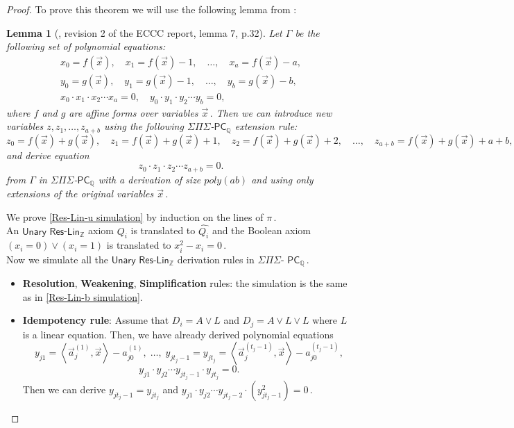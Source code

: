 \documentclass[11pt]{article}
\newtheorem{lemma}[theorem]{Lemma}
\newcommand{\Q}{{\mathbb Q}}
\newcommand{\Z}{{\mathbb Z}}
\begin{document}
\begin{proof}
To prove this theorem we will use the following lemma from \cite{IMP19_new}:
\begin{lemma}[\cite{IMP19_new}, revision 2 of the ECCC report, lemma 7, p.32]\label{lem:unary sum}
%
%
Let $\Gamma$ be the following set of polynomial equations: %
%
%
%
%
%
%
%
%
%
\begin{align*}
x_0 = f(\vec x), \quad x_1 = f(\vec x) - 1, \quad \ldots, \quad x_a = f(\vec x) - a, \\
y_0 = g(\vec x), \quad y_1 = g(\vec x) - 1, \quad \ldots, \quad y_b = g(\vec x) - b, \\
x_0 \cdot x_1 \cdot x_2 \cdots x_a = 0, \quad y_0 \cdot y_1 \cdot y_2 \cdots y_b = 0,
\end{align*}
%
where $f$ and $g$ are affine forms over variables %
$\vec x\,.$ %
%
Then we can introduce new variables $z, z_1, \ldots, z_{a + b}$ using the following $\Sigma \Pi \Sigma$-$\mathsf{PC}_{\Q}$ extension rule:
$$
z_0 = f(\vec x) + g(\vec x), \quad z_1 = f(\vec x) + g(\vec x) + 1, \quad  z_2 = f(\vec x) + g(\vec x) + 2 , \quad \ldots, \quad z_{a + b} = f(\vec x) + g(\vec x) + a + b,
$$
and derive equation
$$
z_0 \cdot z_1 \cdot z_2 \cdots z_{a + b} = 0.
$$
from $\Gamma$ in $\Sigma \Pi \Sigma$-$\mathsf{PC}_{\Q}$ with a derivation of size $poly(a b)$ and using only extensions of the original variables %
$\vec x\,.$ %


\end{lemma}

We prove \autoref{Res-Lin-u simulation} by induction on the lines of %
$\pi\,.$ %
\mbox{}\\  An $\mathsf{Unary}$ $\mathsf{Res}$-$\mathsf{Lin}_\Z$ axiom $Q_i$ is translated to $\widehat{Q_i}$ and the Boolean axiom $(x_i = 0) \vee (x_i = 1)$ is translated to  %
$x_i^2 - x_i = 0\,.$ %
\mbox{}\\  Now we simulate all the $\mathsf{Unary}$ $\mathsf{Res}$-$\mathsf{Lin}_\Z$ derivation rules in $\Sigma \Pi \Sigma$-%
$\mathsf{PC}_{\Q}\,.$ %
\begin{itemize}
    \item \textbf{Resolution}, \textbf{Weakening}, \textbf{Simplification} rules: the simulation is the same as in \autoref{Res-Lin-b simulation}.
    \item \textbf{Idempotency rule}: Assume that $D_i = A \vee L$ and $D_j = A \vee L \vee L$ where $L$ is a linear equation. 
    Then, we have already derived polynomial equations 
    $$
    y_{j 1} = \left\langle \vec a_j^{(1)}, \vec x \right \rangle - a_{j 0}^{(1)}, \; \ldots, \; y_{j t_{j} - 1} = y_{j t_j} = \left\langle \vec a_j^{(t_j - 1)}, \vec x \right \rangle - a_{j 0}^{(t_j - 1)},
    $$
    $$
    y_{j 1} \cdot y_{j 2} \cdots y_{j t_j - 1} \cdot y_{j t_j} = 0.
    $$
    Then we can derive $y_{j t_j - 1} = y_{j t_j}$ and %
$y_{j 1} \cdot y_{j 2} \cdots y_{j t_j - 2} \cdot (y_{j t_j - 1}^2) = 0\,.$ %


\end{itemize}
\end{proof}
\end{document}
